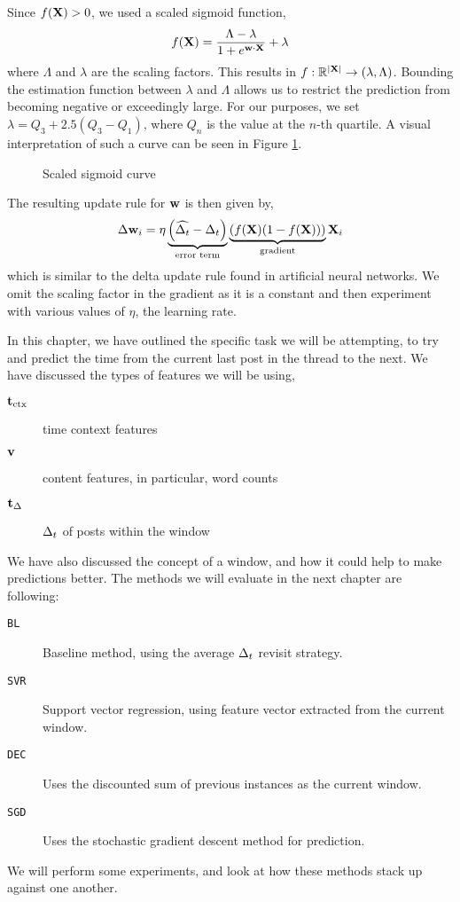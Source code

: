 Since $f(\mathbf{X}) > 0$, we used a scaled sigmoid function,
\[
	f(\mathbf{X}) = \frac{\Lambda-\lambda}{1 + e^{\mathbf{w} \cdot \mathbf{X}}} + \lambda
\]
where $\Lambda$ and $\lambda$ are the scaling factors. This results in $f: 
\mathbb{R}^{|\mathbf{X}|}  \rightarrow (\lambda,\Lambda)$. Bounding the estimation 
function between $\lambda$ and $\Lambda$ allows us to restrict the prediction 
from becoming negative or exceedingly large. For our purposes, we set 
$\lambda = Q_3 + 2.5(Q_{3} - Q_{1})$, where $Q_n$ is the value at the $n$-th 
quartile. A visual interpretation of such a curve can be seen in Figure 
\ref{fig:scaled_sigmoid}.
\begin{figure}
\begin{center}
\end{center}
\caption{Scaled sigmoid curve}\label{fig:scaled_sigmoid}
\end{figure}

The resulting update rule for $\mathbf{w}$ is then given by,
\[
	\Delta \mathbf{w}_i = \eta
				\underbrace{\left(\widehat{\Delta_t} - \Delta_t \right)}_{\text{error term}}
				\underbrace{\left( f(\mathbf{X})(1-f(\mathbf{X})) \right)}_{\text{gradient}}
						\mathbf{X}_i
\]
which is similar to the delta update rule found in artificial neural networks.  
We omit the scaling factor in the gradient as it is a constant and then 
experiment with various values of $\eta$, the learning rate. 

In this chapter, we have outlined the specific task we will be attempting, to 
try and predict the time from the current last post in the thread to the next.
We have discussed the types of features we will be using,
\begin{description}
	\item[$\mathbf{t}_\text{ctx}$] time context features
	\item[$\mathbf{v}$] content features, in particular, word counts
	\item[$\mathbf{t}_\Delta$] $\Delta_t$ of posts within the window
\end{description}
We have also discussed the concept of a window, and how it could help to make 
predictions better. The methods we will evaluate in the next chapter are 
following:
\begin{description}
	\item[\texttt{BL}] Baseline method, using the average $\Delta_t$ revisit 
strategy.
	\item[\texttt{SVR}] Support vector regression, using feature vector 
extracted from the current window.
	\item[\texttt{DEC}] Uses the discounted sum of previous instances as the 
current window.
	\item[\texttt{SGD}] Uses the stochastic gradient descent method for 
prediction.
\end{description}
We will perform some experiments, and look at how these methods stack up against 
one another.
